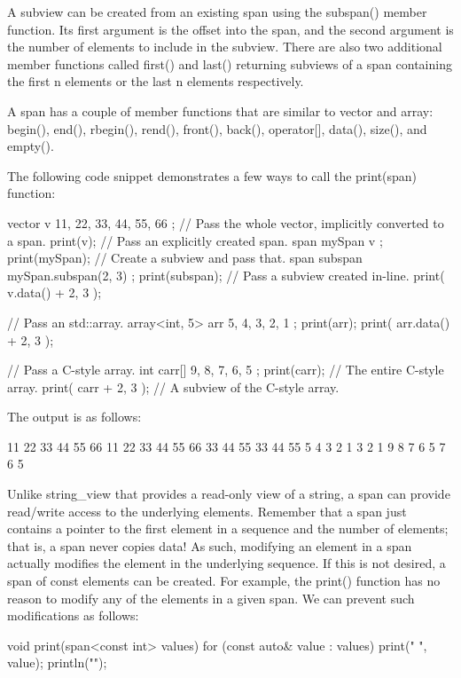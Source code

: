 A subview can be created from an existing span using the subspan() member function. Its first argument is the offset into the span, and the second argument is the number of elements to include in the subview. There are also two additional member functions called first() and last() returning subviews of a span containing the first n elements or the last n elements respectively.

A span has a couple of member functions that are similar to vector and array: begin(), end(), rbegin(), rend(), front(), back(), operator[], data(), size(), and empty().

The following code snippet demonstrates a few ways to call the print(span) function:

\begin{cpp}
vector v { 11, 22, 33, 44, 55, 66 };
// Pass the whole vector, implicitly converted to a span.
print(v);
// Pass an explicitly created span.
span mySpan { v };
print(mySpan);
// Create a subview and pass that.
span subspan { mySpan.subspan(2, 3) };
print(subspan);
// Pass a subview created in-line.
print({ v.data() + 2, 3 });

// Pass an std::array.
array<int, 5> arr { 5, 4, 3, 2, 1 };
print(arr);
print({ arr.data() + 2, 3 });

// Pass a C-style array.
int carr[] { 9, 8, 7, 6, 5 };
print(carr); // The entire C-style array.
print({ carr + 2, 3 }); // A subview of the C-style array.
\end{cpp}

The output is as follows:

\begin{shell}
11 22 33 44 55 66
11 22 33 44 55 66
33 44 55
33 44 55
5 4 3 2 1
3 2 1
9 8 7 6 5
7 6 5
\end{shell}

Unlike string\_view that provides a read-only view of a string, a span can provide read/write access to the underlying elements. Remember that a span just contains a pointer to the first element in a sequence and the number of elements; that is, a span never copies data! As such, modifying an element in a span actually modifies the element in the underlying sequence. If this is not desired, a span of const elements can be created. For example, the print() function has no reason to modify any of the elements in a given span. We can prevent such modifications as follows:

\begin{cpp}
void print(span<const int> values)
{
    for (const auto& value : values) { print("{} ", value); }
    println("");
}
\end{cpp}

